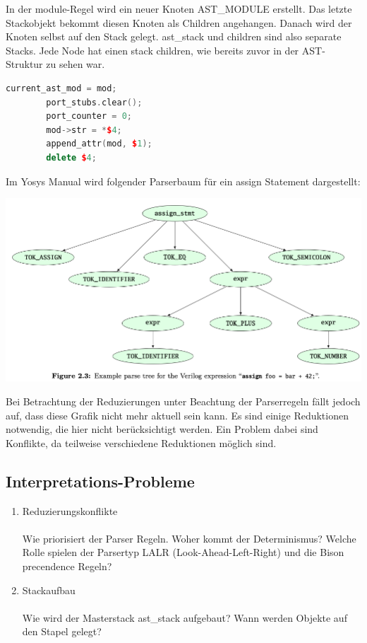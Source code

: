 \documentclass[11pt]{report}
\begin{document}
In der module-Regel wird ein neuer Knoten AST\_MODULE erstellt. Das letzte Stackobjekt bekommt diesen Knoten als Children angehangen. Danach wird der Knoten selbst auf den Stack gelegt. ast\_stack und children sind also separate Stacks. Jede Node hat einen stack children, wie bereits zuvor in der AST-Struktur zu sehen war.
\begin{lstlisting}[language=C++]
	current_ast_mod = mod;
		port_stubs.clear();
		port_counter = 0;
		mod->str = *$4;
		append_attr(mod, $1);
		delete $4;
\end{lstlisting}


Im Yosys Manual wird folgender Parserbaum für ein assign Statement dargestellt:
\begin{center}
	\includegraphics[scale=0.4]{assignstmt.png}
\end{center}

Bei Betrachtung der Reduzierungen unter Beachtung der Parserregeln fällt jedoch auf, dass diese Grafik nicht mehr aktuell sein kann.
Es sind einige Reduktionen notwendig, die hier nicht berücksichtigt werden. Ein Problem dabei sind Konflikte, da teilweise verschiedene Reduktionen möglich sind.

\subsection{Interpretations-Probleme}
\begin{enumerate}
  \item Reduzierungskonflikte
\\
\\
Wie priorisiert der Parser Regeln. Woher kommt der Determinismus? Welche Rolle spielen der Parsertyp LALR (Look-Ahead-Left-Right) und die Bison precendence Regeln?
  \item Stackaufbau
\\
\\
Wie wird der Masterstack ast\_stack aufgebaut? Wann werden Objekte auf den Stapel gelegt? 
\end{enumerate}
\end{document}
